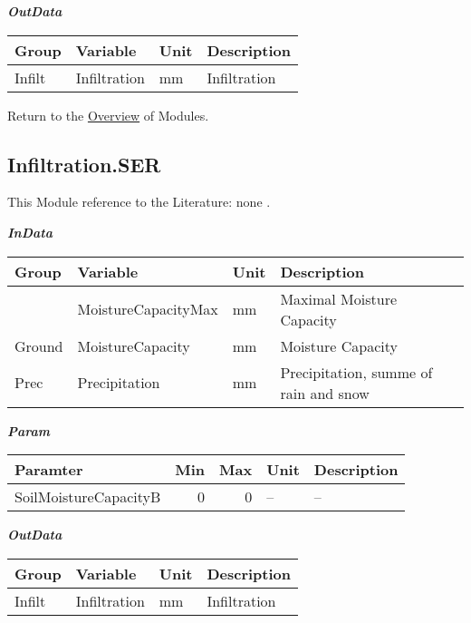 \documentclass[
]{book}
\begin{document}
\textbf{\emph{OutData}}

\begin{table}[!h]
\centering
\begin{tabular}{l|l|l|l}
\hline
Group & Variable & Unit & Description\\
\hline
Infilt & Infiltration & mm & Infiltration\\
\hline
\end{tabular}
\end{table}

Return to the \protect\hyperlink{module}{Overview} of Modules.

\hypertarget{Infiltration.SER}{%
\subsection{Infiltration.SER}\label{Infiltration.SER}}

This Module reference to the Literature: none \citep{none}.

\textbf{\emph{InData}}

\begin{table}[!h]
\centering
\begin{tabular}{l|l|l|l}
\hline
Group & Variable & Unit & Description\\
\hline
 & MoistureCapacityMax & mm & Maximal Moisture Capacity\\
\cline{2-4}
\multirow{-2}{*}{\raggedright\arraybackslash Ground} & MoistureCapacity & mm & Moisture Capacity\\
\cline{1-4}
Prec & Precipitation & mm & Precipitation, summe of rain and snow\\
\hline
\end{tabular}
\end{table}

\textbf{\emph{Param}}

\begin{table}[!h]
\centering
\begin{tabular}{l|r|r|l|l}
\hline
Paramter & Min & Max & Unit & Description\\
\hline
SoilMoistureCapacityB & 0 & 0 & -- & --\\
\hline
\end{tabular}
\end{table}

\textbf{\emph{OutData}}

\begin{table}[!h]
\centering
\begin{tabular}{l|l|l|l}
\hline
Group & Variable & Unit & Description\\
\hline
Infilt & Infiltration & mm & Infiltration\\
\hline
\end{tabular}
\end{table}
\end{document}
